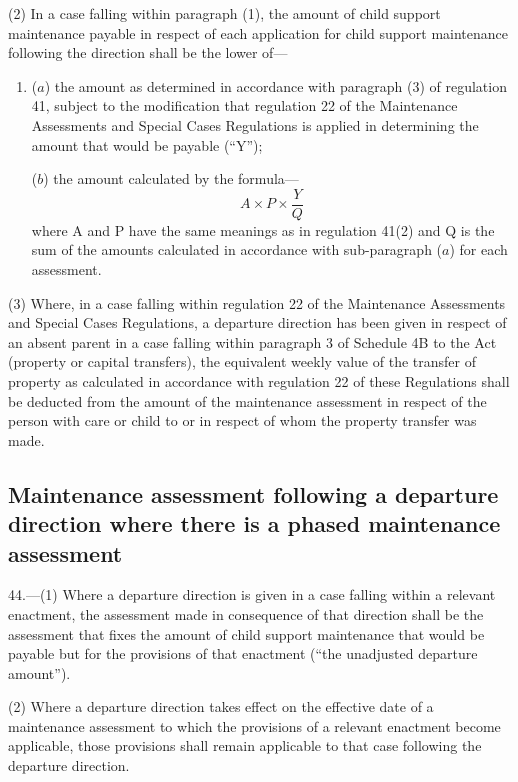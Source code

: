 \documentclass[a4paper]{article}
\begin{document}
(2) In a case falling within paragraph (1), the amount of child support
maintenance payable in respect of each application for child support maintenance
following the direction shall be the lower of—
\begin{enumerate}\item[]
($a$) the amount as determined in accordance with paragraph (3) of regulation 41,
subject to the modification that regulation 22 of the Maintenance Assessments
and Special Cases Regulations is applied in determining the amount that would be
payable (“Y”);

($b$) the amount calculated by the formula—
\[A \times P \times \frac{Y}{Q}\]
where A and P have the same meanings as in regulation 41(2) and Q is the sum of
the amounts calculated in accordance with sub-paragraph ($a$) for each assessment.
\end{enumerate}

(3) Where, in a case falling within regulation 22 of the Maintenance Assessments
and Special Cases Regulations, a departure direction has been given in respect
of an absent parent in a case falling within paragraph 3 of Schedule 4B to the
Act (property or capital transfers), the equivalent weekly value of the transfer
of property as calculated in accordance with regulation 22 of these Regulations
shall be deducted from the amount of the maintenance assessment in respect of
the person with care or child to or in respect of whom the property transfer was
made.

\subsection[44. Maintenance assessment following a departure direction where there is a phased
maintenance assessment]{Maintenance assessment following a departure direction where there is a phased
maintenance assessment}

44.—(1) Where a departure direction is given in a case
falling within a relevant enactment, the assessment made in consequence of that
direction shall be the assessment that fixes the amount of child support
maintenance that would be payable but for the provisions of that enactment (“the
unadjusted departure amount”).

(2) Where a departure direction takes effect on the effective date of a
maintenance assessment to which the provisions of a relevant enactment become
applicable, those provisions shall remain applicable to that case following the
departure direction.
\end{document}

